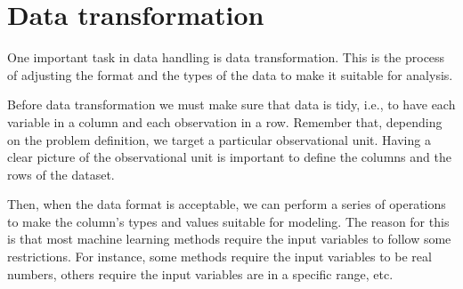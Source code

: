 \section{Data transformation}

One important task in data handling is data transformation.  This is the process of adjusting
the format and the types of the data to make it suitable for analysis.

Before data transformation we must make sure that data is tidy, i.e., to have
each variable in a column and each observation in a row.  Remember that, depending on the
problem definition, we target a particular observational unit.  Having a clear picture of
the observational unit is important to define the columns and the rows of the dataset.

Then, when the data format is acceptable, we can perform a series of operations to make the
column's types and values suitable for modeling.  The reason for this is that most
machine learning methods require the input variables to follow some restrictions.  For
instance, some methods require the input variables to be real numbers, others require the
input variables are in a specific range, etc.

%
%
%
%


